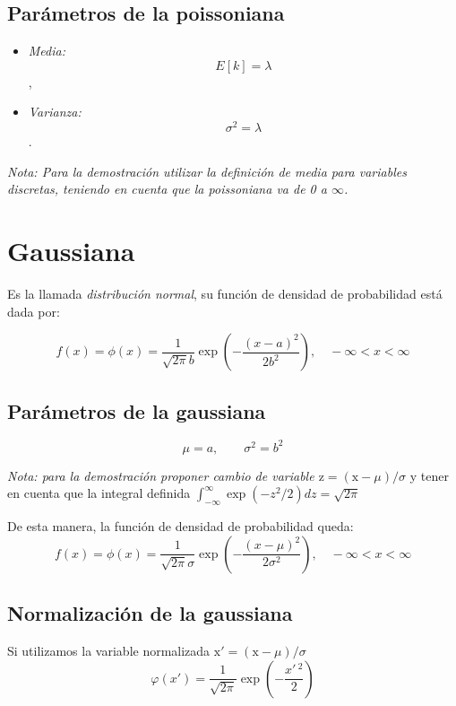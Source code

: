 \documentclass[openany]{book}
\begin{document}
\subsection{Parámetros de la poissoniana}
\begin{itemize}
  \item \emph{Media:}$$E\left[k\right]=\lambda$$,
  \item \emph{Varianza:}$$\sigma^{2}=\lambda$$.
\end{itemize}
\par \emph{Nota: Para la demostración utilizar la definición de media para variables discretas, teniendo en cuenta que la poissoniana va de 0 a $\infty$.}

\section{Gaussiana}
Es la llamada \emph{distribución normal}, su función de densidad de probabilidad está dada por:

\begin{equation*}
  f(x)=\phi(x)=\frac{1}{\sqrt{2\pi}b}\exp{\left(-\frac{(x-a)^2}{2b^2}\right)},\quad -\infty<x<\infty
\end{equation*}

\subsection{Parámetros de la gaussiana}
\begin{equation*}
  \mu=a,\qquad \sigma^2=b^2
\end{equation*}

\par \emph{Nota: para la demostración proponer cambio de variable $\mathrm{z}=(\mathrm{x}-\mu)/\sigma$} y tener en cuenta que la integral definida $\int_{-\infty}^{\infty}\exp{(-z^2/2)}dz=\sqrt{2\pi}$

\par De esta manera, la función de densidad de probabilidad queda:
\begin{equation}
  f(x)=\phi(x)=\frac{1}{\sqrt{2\pi}\sigma}\exp{\left(-\frac{(x-\mu)^2}{2\sigma^2}\right)},\quad -\infty<x<\infty
  \label{eq:fdp-gaussiana}
\end{equation}

\subsection{Normalización de la gaussiana}
Si utilizamos la variable normalizada $\mathrm{x}'=(\mathrm{x}-\mu)/\sigma$
\begin{equation}
  \label{eq:fdp-gaussiana-normalizada}
  \varphi(x')=\frac{1}{\sqrt{2\pi}}\exp{\left(-\frac{x'\,^2}{2}\right)}
\end{equation}
\end{document}
